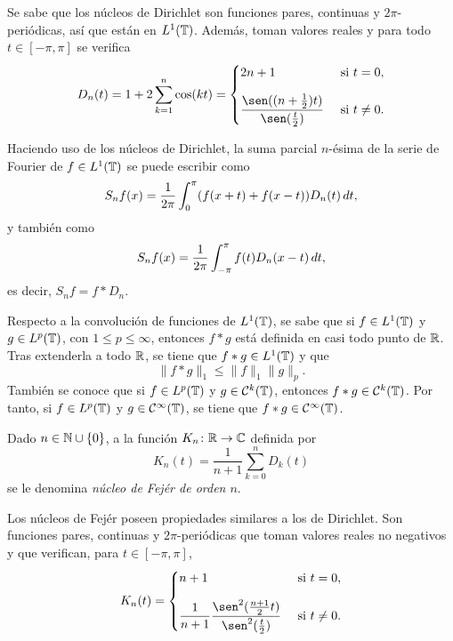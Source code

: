 \documentclass[a4paper, 12pt, oneside]{book}
\begin{document}
Se sabe que los núcleos de Dirichlet son funciones pares, continuas y $2\pi$-periódicas, así que están en $L^1(\mathbb T)$. Además, toman valores reales y para todo $t \in [-\pi,\pi]$ se verifica
\[D_n(t) = 1+2\sum_{k=1}^n \cos(kt) = \begin{cases}
    2n+1 & $ si $ t = 0, \\[10pt]
    \displaystyle\frac{\sen((n+\frac{1}{2})t)}{\sen(\frac{t}{2})} & $ si $ t \neq 0.
\end{cases}\]

Haciendo uso de los núcleos de Dirichlet, la suma parcial $n$-ésima de la serie de Fourier de $f \in L^1(\mathbb T)$ se puede escribir como
\begin{equation}\label{1.2.3}
    S_nf(x) = \frac{1}{2\pi}\int_{0}^{\pi} (f(x+t)+f(x-t))D_n(t) \, dt,
\end{equation}
y también como
\begin{equation}\label{1.2.4}
    S_nf(x) = \frac{1}{2\pi}\int_{-\pi}^{\pi} f(t)D_n(x-t) \, dt,
\end{equation}
es decir, $S_nf = f \ast D_n$.

Respecto a la convolución de funciones de $L^1(\mathbb T)$, se sabe que si $f \in L^1(\mathbb T)$ y $g \in L^p(\mathbb T)$, con $1 \leq p \leq \infty$, entonces $f \ast g$ está definida en casi todo punto de $\mathbb R$. Tras extenderla a todo $\mathbb R$, se tiene que $f \ast g \in L^1(\mathbb T)$ y que
\[\|f \ast g\|_1 \leq \|f\|_1\|g\|_p.\]
También se conoce que si $f \in L^p(\mathbb T)$ y $g \in \mathcal{C}^k(\mathbb T)$, entonces $f \ast g \in \mathcal{C}^k(\mathbb T)$. Por tanto, si $f \in L^p(\mathbb T)$ y $g \in \mathcal{C}^\infty(\mathbb T)$, se tiene que $f \ast g \in \mathcal{C}^\infty(\mathbb T)$.

\begin{definition}\label{1.2.5}
    Dado $n \in \mathbb N \cup \{0\}$, a la función $K_n \colon \mathbb R \to \mathbb C$ definida por
    \[K_n(t) = \frac{1}{n+1}\sum_{k=0}^n D_k(t)\]
    se le denomina \emph{núcleo de Fejér de orden $n$}.
\end{definition}

Los núcleos de Fejér poseen propiedades similares a los de Dirichlet. Son funciones pares, continuas y $2\pi$-periódicas que toman valores reales no negativos y que verifican, para $t \in [-\pi,\pi]$,
\[K_n(t) = \begin{cases}
    n+1 & $ si $ t = 0, \\[10pt]
    \displaystyle\frac{1}{n+1}\frac{\sen^2(\frac{n+1}{2}t)}{\sen^2(\frac{t}{2})} & $ si $ t \neq 0. 
\end{cases}\]
\end{document}
